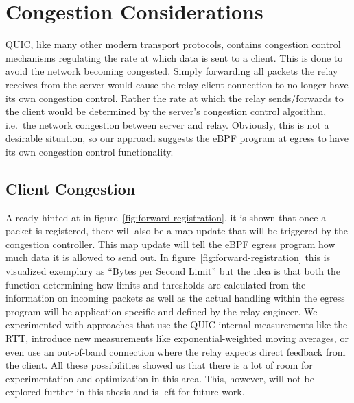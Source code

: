 \section{Congestion Considerations}\label{sec:congestion_considerations}
QUIC, like many other modern transport protocols, contains congestion 
control mechanisms regulating the rate at which data is sent to a client.
This is done to avoid the network becoming congested.
Simply forwarding all packets the relay receives from the server would cause 
the relay-client connection to no longer have its own congestion control.
Rather the rate at which the relay sends/forwards to the client would be determined
by the server's congestion control algorithm, i.e.~the network congestion between 
server and relay.
Obviously, this is not a desirable situation, so our approach suggests the eBPF 
program at egress to have its own congestion control functionality.

\subsection{Client Congestion}
Already hinted at in figure~\ref{fig:forward-registration}, it is shown that once a packet is 
registered, there will also be a map update that will be triggered by the congestion controller.
This map update will tell the eBPF egress program how much data it is allowed to send out. 
In figure~\ref{fig:forward-registration} this is visualized exemplary as ``Bytes per Second Limit''
but the idea is that both the function determining how limits and thresholds are calculated from 
the information on incoming packets as well as the actual handling within the egress program 
will be application-specific and defined by the relay engineer.
We experimented with approaches that use the QUIC internal measurements like the RTT, 
introduce new measurements like exponential-weighted moving averages, or even use an 
out-of-band connection where the relay expects direct feedback from the client.
All these possibilities showed us that there is a lot of room for experimentation and optimization
in this area.
This, however, will not be explored further in this thesis and is left for future work.

